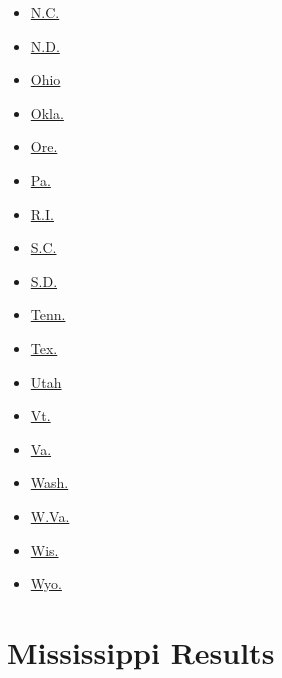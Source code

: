 \begin{itemize}
\tightlist
\item
  \href{//www.nytimes3xbfgragh.onion/elections/2016/results/north-carolina}{N.C.}
\item
  \href{//www.nytimes3xbfgragh.onion/elections/2016/results/north-dakota}{N.D.}
\item
  \href{//www.nytimes3xbfgragh.onion/elections/2016/results/ohio}{Ohio}
\item
  \href{//www.nytimes3xbfgragh.onion/elections/2016/results/oklahoma}{Okla.}
\item
  \href{//www.nytimes3xbfgragh.onion/elections/2016/results/oregon}{Ore.}
\item
  \href{//www.nytimes3xbfgragh.onion/elections/2016/results/pennsylvania}{Pa.}
\item
  \href{//www.nytimes3xbfgragh.onion/elections/2016/results/rhode-island}{R.I.}
\item
  \href{//www.nytimes3xbfgragh.onion/elections/2016/results/south-carolina}{S.C.}
\item
  \href{//www.nytimes3xbfgragh.onion/elections/2016/results/south-dakota}{S.D.}
\item
  \href{//www.nytimes3xbfgragh.onion/elections/2016/results/tennessee}{Tenn.}
\item
  \href{//www.nytimes3xbfgragh.onion/elections/2016/results/texas}{Tex.}
\end{itemize}

\begin{itemize}
\tightlist
\item
  \href{//www.nytimes3xbfgragh.onion/elections/2016/results/utah}{Utah}
\item
  \href{//www.nytimes3xbfgragh.onion/elections/2016/results/vermont}{Vt.}
\item
  \href{//www.nytimes3xbfgragh.onion/elections/2016/results/virginia}{Va.}
\item
  \href{//www.nytimes3xbfgragh.onion/elections/2016/results/washington}{Wash.}
\item
  \href{//www.nytimes3xbfgragh.onion/elections/2016/results/west-virginia}{W.Va.}
\item
  \href{//www.nytimes3xbfgragh.onion/elections/2016/results/wisconsin}{Wis.}
\item
  \href{//www.nytimes3xbfgragh.onion/elections/2016/results/wyoming}{Wyo.}
\end{itemize}

\hypertarget{mississippi-results}{%
\section{Mississippi Results}\label{mississippi-results}}

